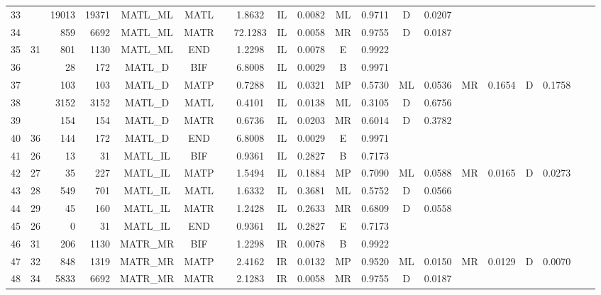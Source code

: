 \documentclass[11pt]{article}
\begin{document}
\begin{table}
\begin{center}
\begin{tabular}{|rr|rr|cc|c|c|cc|cc|cc|cc|cc|cc|}
33  &    & 19013 & 19371 & MATL\_ML & MATL & & 1.8632  & IL & 0.0082 & ML & 0.9711 & D  & 0.0207 &    &        &    &  &  &  \\  
34  &    & 859   & 6692  & MATL\_ML & MATR & & 72.1283 & IL & 0.0058 & MR & 0.9755 & D  & 0.0187 &    &        &    &  &  &  \\  
35  & 31 & 801   & 1130  & MATL\_ML & END  & & 1.2298  & IL & 0.0078 & E  & 0.9922 &    &        &    &        &    &  &  &  \\  
36  &    & 28    & 172   & MATL\_D  & BIF  & & 6.8008  & IL & 0.0029 & B  & 0.9971 &    &        &    &        &    &  &  &  \\  
37  &    & 103   & 103   & MATL\_D  & MATP & & 0.7288  & IL & 0.0321 & MP & 0.5730 & ML & 0.0536 & MR & 0.1654 & D  & 0.1758 &  &  \\  
38  &    & 3152  & 3152  & MATL\_D  & MATL & & 0.4101  & IL & 0.0138 & ML & 0.3105 & D  & 0.6756 &    &        &    &  &  &  \\  
39  &    & 154   & 154   & MATL\_D  & MATR & & 0.6736  & IL & 0.0203 & MR & 0.6014 & D  & 0.3782 &    &        &    &  &  &  \\  
40  & 36 & 144   & 172   & MATL\_D  & END  & & 6.8008  & IL & 0.0029 & E  & 0.9971 &    &        &    &        &    &  &  &  \\  
41  & 26 & 13    & 31    & MATL\_IL & BIF  & & 0.9361  & IL & 0.2827 & B  & 0.7173 &    &        &    &        &    &  &  &  \\  
42  & 27 & 35    & 227   & MATL\_IL & MATP & & 1.5494  & IL & 0.1884 & MP & 0.7090 & ML & 0.0588 & MR & 0.0165 & D  & 0.0273 &  &  \\  
43  & 28 & 549   & 701   & MATL\_IL & MATL & & 1.6332  & IL & 0.3681 & ML & 0.5752 & D  & 0.0566 &    &        &    &  &  &  \\  
44  & 29 & 45    & 160   & MATL\_IL & MATR & & 1.2428  & IL & 0.2633 & MR & 0.6809 & D  & 0.0558 &    &        &    &  &  &  \\  
45  & 26 & 0     & 31    & MATL\_IL & END  & & 0.9361  & IL & 0.2827 & E  & 0.7173 &    &        &    &        &    &  &  &  \\  
46  & 31 & 206   & 1130  & MATR\_MR & BIF  & & 1.2298  & IR & 0.0078 & B  & 0.9922 &    &        &    &        &    &  &  &  \\  
47  & 32 & 848   & 1319  & MATR\_MR & MATP & & 2.4162  & IR & 0.0132 & MP & 0.9520 & ML & 0.0150 & MR & 0.0129 & D  & 0.0070 &  &  \\  
48  & 34 & 5833  & 6692  & MATR\_MR & MATR & & 2.1283  & IR & 0.0058 & MR & 0.9755 & D  & 0.0187 &    &        &    &  &  &  \\  

\end{tabular}
\end{center}
\end{table}
\end{document}
